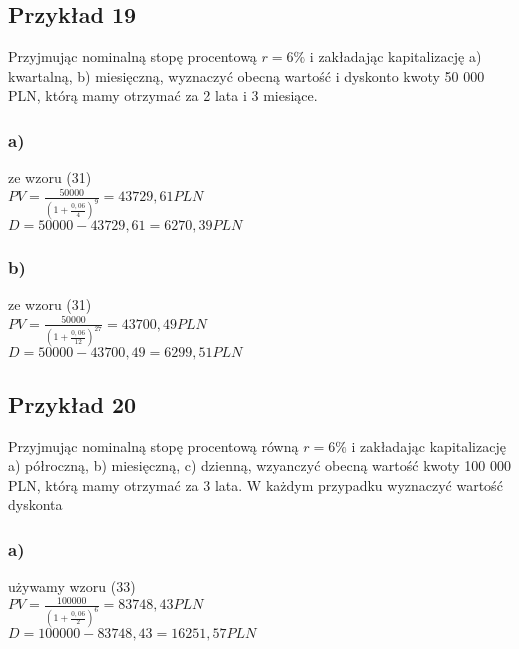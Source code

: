 \documentclass{article}
\begin{document}
\subsection{Przykład 19}

Przyjmując nominalną stopę procentową $ r = 6\% $ i zakładając kapitalizację a) kwartalną, b) miesięczną, wyznaczyć obecną wartość i dyskonto kwoty 50 000 PLN, którą mamy otrzymać za 2 lata i 3 miesiące.

\subsubsection{a)}

ze wzoru (31)\\

$ PV = \frac{50 000}{(1 + \frac{0,06}{4})^9} = 43 729,61 PLN $\\

$ D = 50 000 - 43 729,61 = 6 270,39 PLN $

\subsubsection{b)}

ze wzoru (31)\\

$ PV = \frac{50 000}{(1 + \frac{0,06}{12})^27} = 43 700, 49 PLN $\\

$ D = 50 000 - 43 700, 49 = 6 299, 51 PLN $

\subsection{Przykład 20}

Przyjmując nominalną stopę procentową równą $ r = 6\% $ i zakładając  kapitalizację a) półroczną, b) miesięczną, c) dzienną, wzyanczyć obecną wartość kwoty 100 000 PLN, którą mamy otrzymać za 3 lata. W każdym przypadku wyznaczyć wartość dyskonta

\subsubsection{a)}

używamy wzoru (33)\\

$ PV = \frac{100 000}{(1 + \frac{0,06}{2})^6} = 83 748,43 PLN $\\

$ D = 100 000 - 83 748,43 = 16 251,57 PLN $
\end{document}

